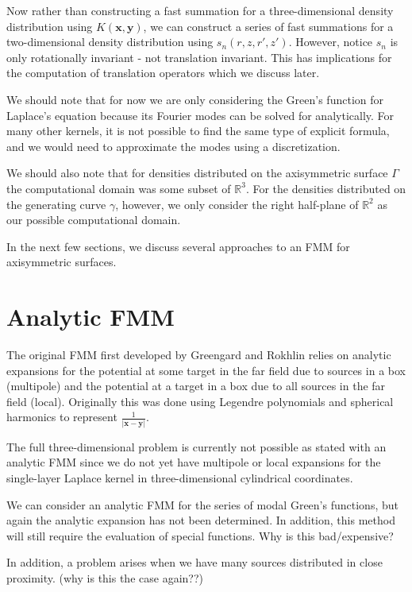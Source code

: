 \documentclass[11pt, oneside]{article}   	%
\begin{document}
Now rather than constructing a fast summation for a three-dimensional density distribution using $K(\mathbf{x},\mathbf{y})$, we can construct a series of fast summations for a two-dimensional density distribution using $s_n(r,z,r',z')$. However, notice $s_n$ is only rotationally invariant - not translation invariant. This has implications for the computation of translation operators which we discuss later.

We should note that for now we are only considering the Green's function for Laplace's equation because its Fourier modes can be solved for analytically. For many other kernels, it is not possible to find the same type of explicit formula, and we would need to approximate the modes using a discretization.

We should also note that for densities distributed on the axisymmetric surface $\Gamma$ the computational domain was some subset of $\mathbb{R}^3$. For the densities distributed on the generating curve $\gamma$, however, we only consider the right half-plane of $\mathbb{R}^2$ as our possible computational domain.

In the next few sections, we discuss several approaches to an FMM for axisymmetric surfaces.

\section{Analytic FMM}
The original FMM first developed by Greengard and Rokhlin relies on analytic expansions for the potential at some target in the far field due to sources in a box (multipole) and the potential at a target in a box due to all sources in the far field (local). Originally this was done using Legendre polynomials and spherical harmonics to represent $\frac{1}{|\mathbf{x}-\mathbf{y}|}$.

The full three-dimensional problem is currently not possible as stated with an analytic FMM since we do not yet have multipole or local expansions for the single-layer Laplace kernel in three-dimensional cylindrical coordinates.

We can consider an analytic FMM for the series of modal Green's functions, but again the analytic expansion has not been determined. In addition, this method will still require the evaluation of special functions. Why is this bad/expensive?

In addition, a problem arises when we have many sources distributed in close proximity. (why is this the case again??)
\end{document}
